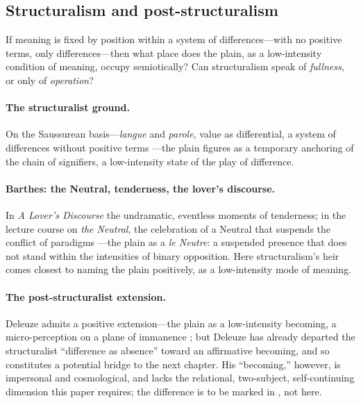 \subsection{Structuralism and post-structuralism}
\label{p19:sub:theories-structuralism}

If meaning is fixed by position within a system of differences---with no positive terms, only differences---then what place does the plain, as a low-intensity condition of meaning, occupy semiotically? Can structuralism speak of \emph{fullness}, or only of \emph{operation}?

\paragraph{The structuralist ground.} On the Saussurean basis---\emph{langue} and \emph{parole}, value as differential, a system of differences without positive terms \parencite{saussure1959}---the plain figures as a temporary anchoring of the chain of signifiers, a low-intensity state of the play of difference.

\paragraph{Barthes: the Neutral, tenderness, the lover's discourse.} In \emph{A Lover's Discourse} the undramatic, eventless moments of tenderness; in the lecture course on \emph{the Neutral}, the celebration of a Neutral that suspends the conflict of paradigms \parencite{barthes1978,barthes2005}---the plain as a \emph{le Neutre}: a suspended presence that does not stand within the intensities of binary opposition. Here structuralism's heir comes closest to naming the plain positively, as a low-intensity mode of meaning.

\paragraph{The post-structuralist extension.} Deleuze admits a positive extension---the plain as a low-intensity becoming, a micro-perception on a plane of immanence \parencite{deleuze1987}; but Deleuze has already departed the structuralist ``difference as absence'' toward an affirmative becoming, and so constitutes a potential bridge to the next chapter. His ``becoming,'' however, is impersonal and cosmological, and lacks the relational, two-subject, self-continuing dimension this paper requires; the difference is to be marked in , not here.

